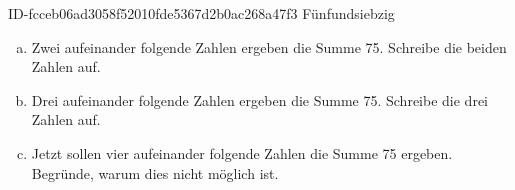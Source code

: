 \begin{exercise}
      {ID-fcceb06ad3058f52010fde5367d2b0ac268a47f3}
      {Fünfundsiebzig}
  \ifproblem\problem
    \begin{enumerate}[a)]
      \item Zwei aufeinander folgende Zahlen ergeben die Summe 75.
            Schreibe die beiden Zahlen auf.
      \item Drei aufeinander folgende Zahlen ergeben die Summe 75.
            Schreibe die drei Zahlen auf.
      \item Jetzt sollen vier aufeinander folgende Zahlen die Summe 75 ergeben.
            Begründe, warum dies nicht möglich ist.
    \end{enumerate}
  \fi
\end{exercise}
